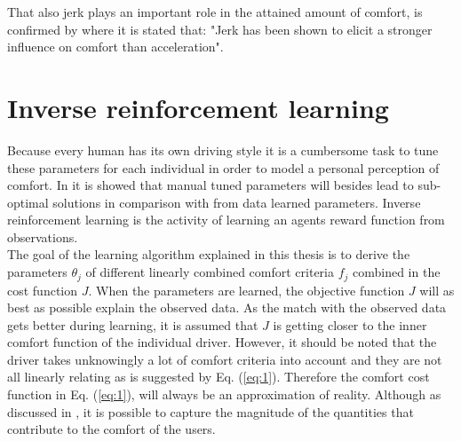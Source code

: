 That also jerk plays an important role in the attained amount of comfort, is confirmed by \cite{Gianna1996} where it is stated that: "Jerk has been shown to elicit a stronger influence on comfort than acceleration".




\section{Inverse reinforcement learning}
Because every human has its own driving style it is a cumbersome task to tune these parameters for each individual in order to model a personal perception of comfort. In \cite{Powers} it is showed that manual tuned parameters will besides lead  to sub-optimal solutions in comparison with from data learned parameters. Inverse reinforcement learning is the activity of learning an agents reward function from observations. \\

The goal of the learning algorithm explained in this thesis is to derive the parameters $\theta_j$ of different linearly combined comfort criteria $f_j$ combined in the cost function $J$. When the parameters are learned, the objective function $J$ will as best as possible explain the observed data. As the match with the observed data gets better during learning, it is assumed that $J$ is getting closer to the inner comfort function of the individual driver. However, it should be noted that the driver takes unknowingly a lot of comfort criteria into account and they are not all linearly relating as is suggested by Eq. (\ref{eq:1}). Therefore the comfort cost function in Eq. (\ref{eq:1}), will always be an approximation of reality. Although as discussed in \cite{Kuderer2015a}, it is possible to capture the magnitude of the quantities that contribute to the comfort of the users.\\

